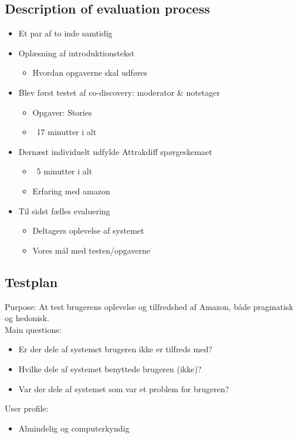 \subsection{Description of evaluation process}
\begin{itemize}
\item Et par af to inde samtidig
\item Oplæsning af introduktionstekst
\begin{itemize}
\item Hvordan opgaverne skal udføres
\end{itemize}
\item Blev først testet af co-discovery: moderator \& notetager
\begin{itemize}
\item Opgaver: Stories
\item ~17 minutter i alt
\end{itemize}
\item Dern\ae st individuelt udfylde Attrakdiff spørgeskemaet
\begin{itemize}
\item ~5 minutter i alt
\item Erfaring med amazon
\end{itemize}
\item Til sidst fælles evaluering
\begin{itemize}
\item Deltagers oplevelse af systemet
\item Vores m\aa l med testen/opgaverne
\end{itemize}
\end{itemize}

\subsection{Testplan}
Purpose: At test brugerens oplevelse og tilfredshed af Amazon, både pragmatisk og hedonisk. \\
Main questions:
\begin{itemize}
\item Er der dele af systemet brugeren ikke er tilfreds med?
\item Hvilke dele af systemet benyttede brugeren (ikke)?
\item Var der dele af systemet som var et problem for brugeren?
\end{itemize}

User profile:
\begin{itemize}
\item Almindelig og computerkyndig
\end{itemize}

